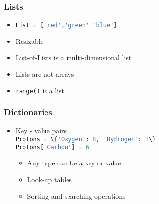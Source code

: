 \documentclass[xcolor=table,10pt,final]{beamer}
\begin{document}
\begin{frame}
  \frametitle{Lists}
  \begin{itemize}
    \item \lstinline[language=Python]|List = ['red','green','blue']|
    \item Resizable %
    \item List-of-Lists is a multi-dimensional list
    \item Lists are not arrays
    \item {\tt range()} is a list
  \end{itemize}
\end{frame}

\begin{frame}
  \frametitle{Dictionaries}
      \begin{itemize}
        \item Key - value pairs\\
          \lstinline[language=Python]|Protons = \{'Oxygen': 8, 'Hydrogen': 1\}|\\
          \lstinline[language=Python]|Protons['Carbon'] = 6|\\
          \begin{itemize}
            \item Any type can be a key or value
            \item Look-up tables
            \item Sorting and searching operations
          \end{itemize}
      \end{itemize}
\end{frame}
\end{document}
